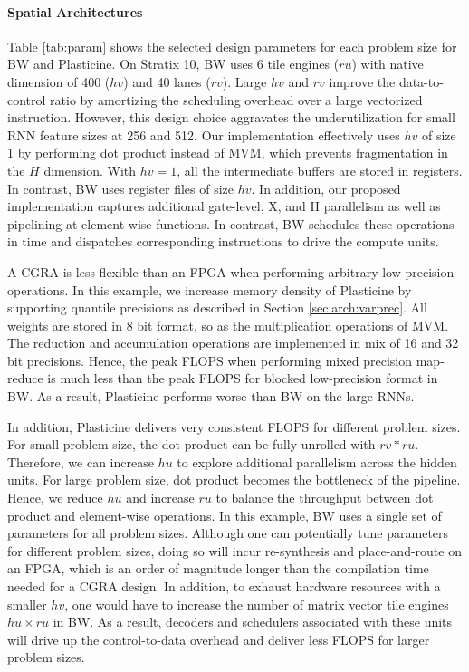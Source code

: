 \paragraph{Spatial Architectures} Table \ref{tab:param} shows the selected design parameters for each 
problem size for BW and Plasticine.
On Stratix 10, BW uses 6 tile engines ($ru$) with native dimension of 400 ($hv$) and 40 lanes ($rv$).
Large $hv$ and $rv$ improve the data-to-control ratio by amortizing the scheduling overhead over a large vectorized instruction.
However, this design choice aggravates the underutilization for small RNN feature sizes at 256 and 512.
Our implementation effectively uses $hv$ of size 1 by performing dot product instead of MVM, 
which prevents fragmentation in the $H$ dimension.
	With $hv=1$, all the intermediate buffers are stored in registers.
In contrast, BW uses register files of size $hv$.
In addition, our proposed implementation captures additional gate-level, X, and H parallelism as well as pipelining at element-wise functions.
In contrast, BW schedules these operations in time and dispatches corresponding instructions to drive the compute units.

A CGRA is less flexible than an FPGA when performing arbitrary low-precision operations. 
In this example,
	we increase memory density of Plasticine by supporting quantile precisions as described in Section \ref{sec:arch:varprec}.
All weights are stored in 8 bit format, so as the multiplication operations of MVM. 
The reduction and accumulation operations are implemented in mix of 16 and 32 bit precisions.
Hence, the peak FLOPS when performing mixed precision map-reduce is much less than the peak FLOPS for blocked low-precision format in BW.
As a result, Plasticine performs worse than BW on the large RNNs.

In addition, Plasticine delivers very consistent FLOPS for
different problem sizes. For small problem size, the dot product can be fully unrolled with $rv * ru$. Therefore, we can
increase $hu$ to explore additional parallelism across the hidden units. For large problem size, dot product becomes the bottleneck of
the pipeline. Hence, we reduce $hu$ and increase $ru$ to balance the throughput between dot product and element-wise operations.
In this example, BW uses a single set of parameters for all problem sizes.
Although one can potentially tune parameters for different problem sizes,
	doing so will incur re-synthesis and place-and-route on an FPGA,
	which is an order of magnitude longer than the compilation time needed for a CGRA design.
In addition, to exhaust hardware resources with a smaller $hv$,
	one would have to increase the number of matrix vector tile engines $hu\times ru$ in BW.
As a result, decoders and schedulers associated with these units
	will drive up the control-to-data overhead and deliver less FLOPS for larger problem sizes.

